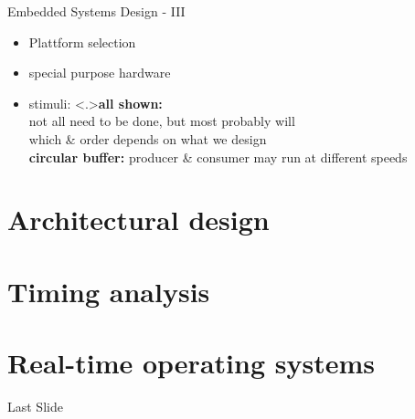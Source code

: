 \documentclass[ngerman={babel}, utf8, bigger, xcolor={table,dvipsnames}, ompress, hyperref={bookmarks,colorlinks}]{beamer}
\begin{document}
\begin{frame}{Embedded Systems Design - III}
	\begin{itemize}
		 \item Plattform selection
		\onslide<1> \item special purpose hardware
		\onslide<1> \item stimuli:
		\note<.>{\textbf{all shown:}\\ not all need to be done, but most probably will \\ which \& order depends on what we design \\ \textbf{circular buffer:} producer \& consumer may run at different speeds}
	\end{itemize}
\end{frame}


\section{Architectural design}

\section{Timing analysis}

\section{Real-time operating systems}


\begin{frame}{Last Slide}
	\vspace*{4em}{\huge Last Slide}
\end{frame}

\end{document}
